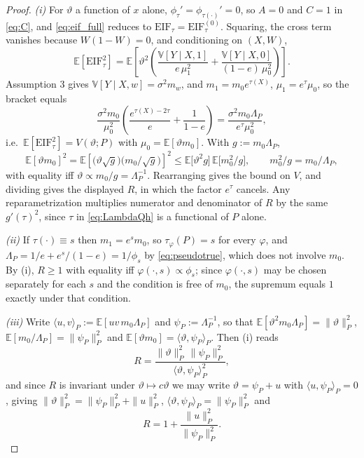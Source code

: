 \documentclass{article}
\begin{document}
\begin{proof}
\emph{(i)} For $\vartheta$ a function of $x$ alone, $\phi_\tau'=\phi_{\tau(\cdot)}'=0$, so $A=0$ and $C=1$ in \eqref{eq:C}, and \eqref{eq:eif_full} reduces to $\mathrm{EIF}_\tau=\mathrm{EIF}^{(0)}_\tau$.  Squaring, the cross term vanishes because $W(1-W)=0$, and conditioning on $(X,W)$,
\[
  \mathbb{E}[\mathrm{EIF}_\tau^2]
  = \mathbb{E}\!\left[\vartheta^2\!\left(\frac{\mathbb{V}[Y\mid X,1]}{e\,\mu_1^2}+\frac{\mathbb{V}[Y\mid X,0]}{(1-e)\,\mu_0^2}\right)\right].
\]
Assumption 3 gives $\mathbb{V}[Y\mid X,w]=\sigma^2m_w$, and $m_1=m_0e^{\tau(X)}$, $\mu_1=e^{\tau}\mu_0$, so the bracket equals
\[
  \frac{\sigma^2m_0}{\mu_0^2}\left(\frac{e^{\tau(X)-2\tau}}{e}+\frac{1}{1-e}\right)
  = \frac{\sigma^2m_0\Lambda_P}{e^{\tau}\mu_0^2},
\]
i.e.\ $\mathbb{E}[\mathrm{EIF}_\tau^2]=V(\vartheta;P)$ with $\mu_0=\mathbb{E}[\vartheta m_0]$.  With $g:=m_0\Lambda_P$,
\[
  \mathbb{E}[\vartheta m_0]^2=\mathbb{E}\!\left[\bigl(\vartheta\sqrt g\bigr)\bigl(m_0/\sqrt g\bigr)\right]^2
  \le \mathbb{E}\bigl[\vartheta^2g\bigr]\,\mathbb{E}\bigl[m_0^2/g\bigr],
  \qquad m_0^2/g=m_0/\Lambda_P,
\]
with equality iff $\vartheta\propto m_0/g=\Lambda_P^{-1}$.  Rearranging gives the bound on $V$, and dividing gives the displayed $R$, in which the factor $e^{\tau}$ cancels.  Any reparametrization multiplies numerator and denominator of $R$ by the same $g'(\tau)^2$, since $\tau$ in \eqref{eq:LambdaQh} is a functional of $P$ alone.

\emph{(ii)} If $\tau(\cdot)\equiv s$ then $m_1=e^{s}m_0$, so $\tau_\varphi(P)=s$ for every $\varphi$, and
$\Lambda_P=1/e+e^{s}/(1-e)=1/\phi_s$ by \eqref{eq:pseudotrue}, which does not involve $m_0$.  By (i), $R\ge1$ with equality iff $\varphi(\cdot,s)\propto\phi_s$; since $\varphi(\cdot,s)$ may be chosen separately for each $s$ and the condition is free of $m_0$, the supremum equals $1$ exactly under that condition.

\emph{(iii)} Write $\langle u,v\rangle_P:=\mathbb{E}[uv\,m_0\Lambda_P]$ and $\psi_P:=\Lambda_P^{-1}$, so that $\mathbb{E}[\vartheta^2m_0\Lambda_P]=\|\vartheta\|_P^2$, $\mathbb{E}[m_0/\Lambda_P]=\|\psi_P\|_P^2$ and $\mathbb{E}[\vartheta m_0]=\langle\vartheta,\psi_P\rangle_P$.  Then (i) reads
\begin{equation}
  \label{eq:Rangle}
  R=\frac{\|\vartheta\|_P^2\,\|\psi_P\|_P^2}{\langle\vartheta,\psi_P\rangle_P^2},
\end{equation}
and since $R$ is invariant under $\vartheta\mapsto c\vartheta$ we may write $\vartheta=\psi_P+u$ with $\langle u,\psi_P\rangle_P=0$, giving $\|\vartheta\|_P^2=\|\psi_P\|_P^2+\|u\|_P^2$, $\langle\vartheta,\psi_P\rangle_P=\|\psi_P\|_P^2$ and
\begin{equation}
  \label{eq:Rexact}
  R=1+\frac{\|u\|_P^2}{\|\psi_P\|_P^2}.
\end{equation}


\end{proof}
\end{document}
